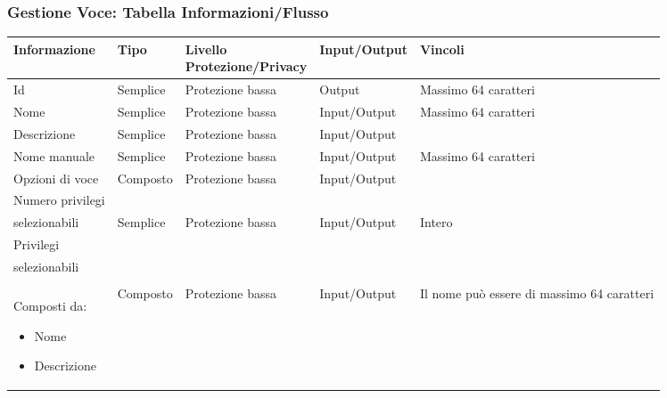 \documentclass[a4paper, 11pt]{article}
\let\newline\\
\begin{document}
\clearpage
\newpage
\subsubsection*{Gestione Voce: Tabella Informazioni/Flusso}
\begin{adjustwidth}{-1.5cm}{-1.5cm}
\begin{center}
    \begin{tabular}{|p{3cm}|p{1.5cm}|p{3.5cm}|p{2.5cm}|p{4cm}|}
        \hline
        \textbf{Informazione} & \textbf{Tipo} & \textbf{Livello \newline Protezione/Privacy} & \textbf{Input/Output}&\textbf{Vincoli}\\
        \hline
        Id & Semplice & Protezione bassa & Output & Massimo 64 caratteri \\
        \hline
        Nome & Semplice & Protezione bassa & Input/Output & Massimo 64 caratteri \\
        \hline
        Descrizione & Semplice & Protezione bassa & Input/Output &  \\
        \hline
        Nome manuale & Semplice & Protezione bassa & Input/Output & Massimo 64 caratteri \\
        \hline        
        Opzioni di voce & Composto & Protezione bassa & Input/Output & \\\hline
        Numero privilegi \newline selezionabili & Semplice & Protezione bassa & Input/Output & Intero \\
        \hline
        Privilegi \newline selezionabili \newline \newline Composti da:
            \begin{itemize}
                \item Nome
                \item Descrizione
            \end{itemize}
         & Composto & Protezione bassa & Input/Output & Il nome può essere di massimo 64 caratteri\\
        \hline
    \end{tabular}
\end{center}
\end{adjustwidth}

\vspace{2em}
\end{document}
